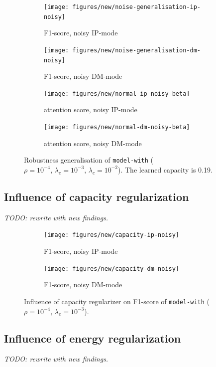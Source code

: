 \begin{figure}[!h]
\centering
\begin{subfigure}{.5\textwidth}
  \centering
  \texttt{[image: figures/new/noise-generalisation-ip-noisy]}
  \caption{F1-score, noisy IP-mode}
  \label{fig:exp-att-shift-6-a}
\end{subfigure}%
\begin{subfigure}{.5\textwidth}
  \centering
  \texttt{[image: figures/new/noise-generalisation-dm-noisy]}
  \caption{F1-score, noisy DM-mode}
 \label{fig:exp-att-shift-6-b} 
\end{subfigure}
\begin{subfigure}{.5\textwidth}
  \centering
  \texttt{[image: figures/new/normal-ip-noisy-beta]}
  \caption{attention score, noisy IP-mode}
   \label{fig:exp-att-shift-6-c} 
\end{subfigure}%
\begin{subfigure}{.5\textwidth}
  \centering
  \texttt{[image: figures/new/normal-dm-noisy-beta]}
  \caption{attention score, noisy DM-mode}
   \label{fig:exp-att-shift-6-d} 
\end{subfigure}
\caption[Robustness generalisation]{Robustness generalisation of \texttt{model-with} ($\rho=10^{-4},\,\lambda_e=10^{-3},\,\lambda_c=10^{-2}$). The learned capacity is 0.19.}
\label{fig:exp-att-shift-6}
\end{figure}

\subsection*{Influence of capacity regularization}
\textit{TODO: rewrite with new findings.}
\begin{figure}[!h]
\centering
\begin{subfigure}{.5\textwidth}
  \centering
  \texttt{[image: figures/new/capacity-ip-noisy]}
  \caption{F1-score, noisy IP-mode}
  \label{fig:exp-att-shift-7-a}
\end{subfigure}%
\begin{subfigure}{.5\textwidth}
  \centering
  \texttt{[image: figures/new/capacity-dm-noisy]}
  \caption{F1-score, noisy DM-mode}
  \label{fig:exp-att-shift-7-b}
\end{subfigure}
\caption[Influence of capacity regularization]{Influence of capacity regularizer on F1-score of \texttt{model-with} ($\rho=10^{-4},\,\lambda_e=10^{-3}$).}
\label{fig:exp-att-shift-7}
\end{figure}

\subsection*{Influence of energy regularization}
\textit{TODO: rewrite with new findings.}

